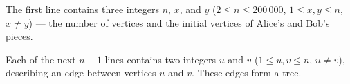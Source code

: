The first line contains three integers $n$, $x$, and $y$ ($2 \le n \le 200\,000$, $1 \le x,y \le n$, $x \ne y$) — the number of vertices and the initial vertices of Alice's and Bob's pieces.

Each of the next $n-1$ lines contains two integers $u$ and $v$ ($1 \le u,v \le n$, $u \ne v$), describing an edge between vertices $u$ and $v$. These edges form a tree.
